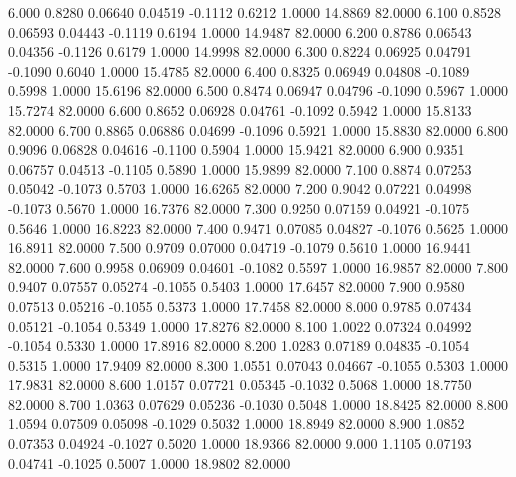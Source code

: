    6.000   0.8280   0.06640   0.04519  -0.1112   0.6212   1.0000  14.8869  82.0000
   6.100   0.8528   0.06593   0.04443  -0.1119   0.6194   1.0000  14.9487  82.0000
   6.200   0.8786   0.06543   0.04356  -0.1126   0.6179   1.0000  14.9998  82.0000
   6.300   0.8224   0.06925   0.04791  -0.1090   0.6040   1.0000  15.4785  82.0000
   6.400   0.8325   0.06949   0.04808  -0.1089   0.5998   1.0000  15.6196  82.0000
   6.500   0.8474   0.06947   0.04796  -0.1090   0.5967   1.0000  15.7274  82.0000
   6.600   0.8652   0.06928   0.04761  -0.1092   0.5942   1.0000  15.8133  82.0000
   6.700   0.8865   0.06886   0.04699  -0.1096   0.5921   1.0000  15.8830  82.0000
   6.800   0.9096   0.06828   0.04616  -0.1100   0.5904   1.0000  15.9421  82.0000
   6.900   0.9351   0.06757   0.04513  -0.1105   0.5890   1.0000  15.9899  82.0000
   7.100   0.8874   0.07253   0.05042  -0.1073   0.5703   1.0000  16.6265  82.0000
   7.200   0.9042   0.07221   0.04998  -0.1073   0.5670   1.0000  16.7376  82.0000
   7.300   0.9250   0.07159   0.04921  -0.1075   0.5646   1.0000  16.8223  82.0000
   7.400   0.9471   0.07085   0.04827  -0.1076   0.5625   1.0000  16.8911  82.0000
   7.500   0.9709   0.07000   0.04719  -0.1079   0.5610   1.0000  16.9441  82.0000
   7.600   0.9958   0.06909   0.04601  -0.1082   0.5597   1.0000  16.9857  82.0000
   7.800   0.9407   0.07557   0.05274  -0.1055   0.5403   1.0000  17.6457  82.0000
   7.900   0.9580   0.07513   0.05216  -0.1055   0.5373   1.0000  17.7458  82.0000
   8.000   0.9785   0.07434   0.05121  -0.1054   0.5349   1.0000  17.8276  82.0000
   8.100   1.0022   0.07324   0.04992  -0.1054   0.5330   1.0000  17.8916  82.0000
   8.200   1.0283   0.07189   0.04835  -0.1054   0.5315   1.0000  17.9409  82.0000
   8.300   1.0551   0.07043   0.04667  -0.1055   0.5303   1.0000  17.9831  82.0000
   8.600   1.0157   0.07721   0.05345  -0.1032   0.5068   1.0000  18.7750  82.0000
   8.700   1.0363   0.07629   0.05236  -0.1030   0.5048   1.0000  18.8425  82.0000
   8.800   1.0594   0.07509   0.05098  -0.1029   0.5032   1.0000  18.8949  82.0000
   8.900   1.0852   0.07353   0.04924  -0.1027   0.5020   1.0000  18.9366  82.0000
   9.000   1.1105   0.07193   0.04741  -0.1025   0.5007   1.0000  18.9802  82.0000
